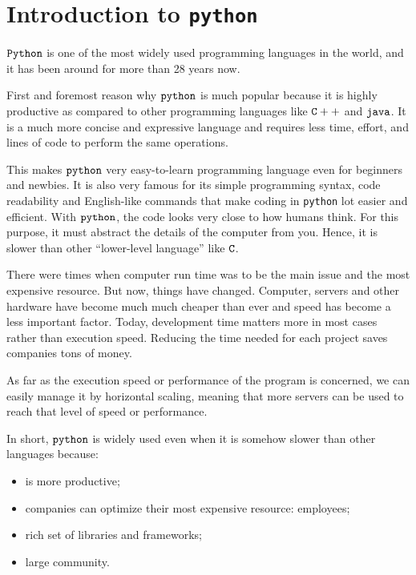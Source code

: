 \chapter{Introduction to \texttt{python}}\label{introduction-to-python---lesson-1}

$\tt{Python}$ is one of the most widely used programming languages in the world, and it has been around for more than 28 years now.

First and foremost reason why $\tt{python}$ is much popular because it is highly productive as compared to other programming languages like $\tt{C++}$ and $\tt{java}$. It is a much more concise and expressive language and requires less time, effort, and lines of code to perform the same operations.

This makes $\tt{python}$ very easy-to-learn programming language even for beginners and newbies. It is also very famous for its simple programming syntax, code readability and English-like commands that make coding in \texttt{python} lot easier and efficient.
With $\tt{python}$, the code looks very close to how humans think. For this purpose, it must abstract the details of the computer from you. Hence, it is slower than other “lower-level language” like $\tt{C}$.

There were times when computer run time was to be the main issue and the most expensive resource. But now, things have changed. Computer, servers and other hardware have become much much cheaper than ever and speed has become a less important factor. Today, development time matters more in most cases rather than execution speed. Reducing the time needed for each project saves companies tons of money.

As far as the execution speed or performance of the program is concerned, we can easily manage it by horizontal scaling, meaning that more servers can be used to reach that level of speed or performance.

In short, $\tt{python}$ is widely used even when it is somehow slower than other languages because:
\begin{itemize}
  \item is more productive;
  \item companies can optimize their most expensive resource: employees;
  \item rich set of libraries and frameworks;
  \item large community.
\end{itemize}


